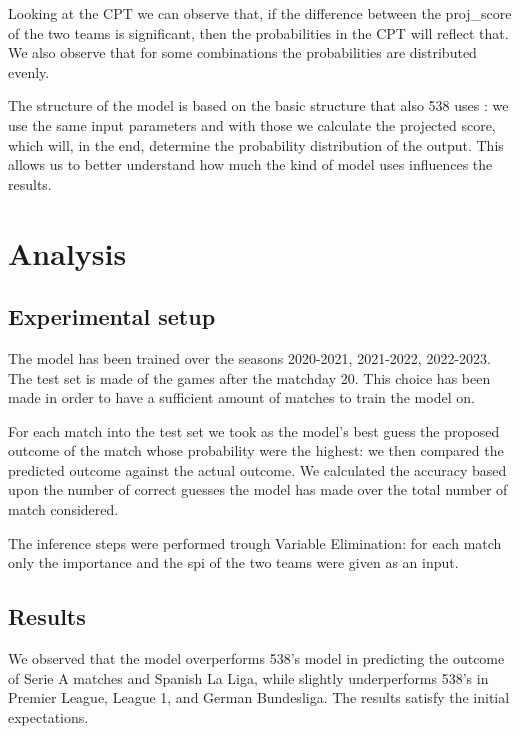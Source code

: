 \documentclass[letterpaper]{article}
\begin{document}
Looking at the CPT we can observe that, if the difference between the proj\_score of the two teams is significant, then the probabilities in the CPT will reflect that. We also observe that for some combinations the probabilities are distributed evenly. 


The structure of the model is based on the basic structure that also 538 uses \cite{538Website}: we use the same input parameters and with those we calculate the projected score, which will, in the end, determine the probability distribution of the output. This allows us to better understand how much the kind of model uses influences the results. 



\section{Analysis}

\subsection{Experimental setup}

The model has been trained over the seasons 2020-2021, 2021-2022, 2022-2023. The test set is made of the games after the matchday 20. This choice has been made in order to have a sufficient amount of matches to train the model on.


For each match into the test set we took as the model's best guess the proposed outcome of the match whose probability were the highest: we then compared the predicted outcome against the actual outcome. We calculated the accuracy based upon the number of correct guesses the model has made over the total number of match considered. 

The inference steps were performed trough Variable Elimination: for each match only the importance and the spi of the two teams were given as an input.


\subsection{Results}

We observed that the model overperforms 538's model in predicting the outcome of Serie A matches and Spanish La Liga, while slightly underperforms 538's in Premier League, League 1, and German Bundesliga.  The results satisfy the initial expectations.
\end{document}

